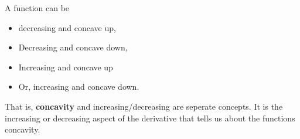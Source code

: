 \documentclass{report}
\begin{document}
\pagebreak
	
\noindent A function can be 
\begin{itemize}
  \item decreasing and concave up, 
\bigbreak \noindent
\item Decreasing and concave down,
\bigbreak \noindent
\item Increasing and concave up
\bigbreak \noindent
\item Or, increasing and concave down.
\end{itemize}
\bigbreak \noindent
  That is, \textbf{concavity}	and increasing/decreasing are seperate concepts. It is the increasing or decreasing aspect of the derivative that tells us about the functions concavity.
\begin{figure}[ht]
    \centering
\end{figure}
\bigbreak \noindent
\end{document}
